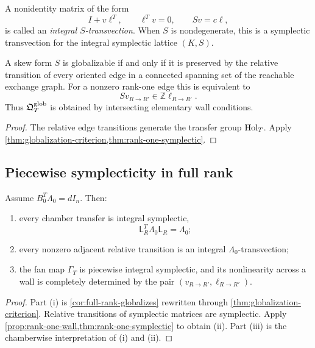 \begin{definition}
A nonidentity matrix of the form
\[
 I+v\ell^T,
 \qquad \ell^Tv=0,
 \qquad Sv=c\ell,
\]
is called an \emph{integral $S$-transvection}.  When $S$ is nondegenerate,
this is a symplectic transvection for the integral symplectic lattice
$(K,S)$.
\end{definition}

\begin{corollary}
\label{cor:edge-local-test}
A skew form $S$ is globalizable if and only if it is preserved by the relative
transition of every oriented edge in a connected spanning set of the
reachable exchange graph.  For a nonzero rank-one edge this is equivalent to
\[
 Sv_{R\to R'}\in\mathbb Z\ell_{R\to R'}.
\]
Thus $\mathfrak Q^{\mathrm{glob}}_T$ is obtained by intersecting elementary wall conditions.
\end{corollary}

\begin{proof}
The relative edge transitions generate the transfer group $\operatorname{Hol}_T$.  Apply
\cref{thm:globalization-criterion,thm:rank-one-symplectic}.
\end{proof}

\subsection{Piecewise symplecticity in full rank}

\begin{theorem}
\label{thm:piecewise-symplectic}
Assume $B_0^T\Lambda_0=dI_n$.  Then:
\begin{enumerate}[label=(\roman*),leftmargin=2.4em]
\item every chamber transfer is integral symplectic,
      \begin{equation}
       \mathsf L_R^T\Lambda_0\mathsf L_R=\Lambda_0;
       \label{eq:piecewise-symplectic}
      \end{equation}
\item every nonzero adjacent relative transition is an integral
      $\Lambda_0$-transvection;
\item the fan map $\Gamma_T$ is piecewise integral symplectic, and its
      nonlinearity across a wall is completely determined by the pair
      $(v_{R\to R'},\ell_{R\to R'})$.
\end{enumerate}
\end{theorem}

\begin{proof}
Part (i) is \cref{cor:full-rank-globalizes} rewritten through
\cref{thm:globalization-criterion}.  Relative transitions of symplectic
matrices are symplectic.  Apply
\cref{prop:rank-one-wall,thm:rank-one-symplectic} to obtain (ii).  Part (iii)
is the chamberwise interpretation of (i) and (ii).
\end{proof}

